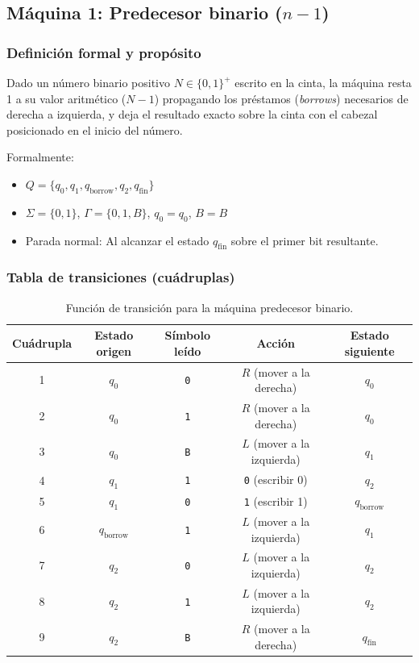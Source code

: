 \documentclass[11pt,letterpaper]{article}
\begin{document}
\subsection{Máquina 1: Predecesor binario ($n - 1$)}

\subsubsection{Definición formal y propósito}
Dado un número binario positivo $N \in \{0, 1\}^+$ escrito en la cinta, la máquina resta 1 a su valor aritmético ($N - 1$) propagando los préstamos (\textit{borrows}) necesarios de derecha a izquierda, y deja el resultado exacto sobre la cinta con el cabezal posicionado en el inicio del número.

Formalmente:
\begin{itemize}
    \item $Q = \{q_0, q_1, q_{\text{borrow}}, q_2, q_{\text{fin}}\}$
    \item $\Sigma = \{0, 1\}$, $\Gamma = \{0, 1, B\}$, $q_0 = q_0$, $B = B$
    \item Parada normal: Al alcanzar el estado $q_{\text{fin}}$ sobre el primer bit resultante.
\end{itemize}

\subsubsection{Tabla de transiciones (cuádruplas)}
\begin{table}[h!]
\centering
\small
\begin{tabular}{ccccc}
\toprule
\textbf{Cuádrupla} & \textbf{Estado origen} & \textbf{Símbolo leído} & \textbf{Acción} & \textbf{Estado siguiente} \\
\midrule
1 & $q_0$ & \texttt{0} & $R$ (mover a la derecha) & $q_0$ \\
2 & $q_0$ & \texttt{1} & $R$ (mover a la derecha) & $q_0$ \\
3 & $q_0$ & \texttt{B} & $L$ (mover a la izquierda) & $q_1$ \\
\midrule
4 & $q_1$ & \texttt{1} & \texttt{0} (escribir 0) & $q_2$ \\
5 & $q_1$ & \texttt{0} & \texttt{1} (escribir 1) & $q_{\text{borrow}}$ \\
6 & $q_{\text{borrow}}$ & \texttt{1} & $L$ (mover a la izquierda) & $q_1$ \\
\midrule
7 & $q_2$ & \texttt{0} & $L$ (mover a la izquierda) & $q_2$ \\
8 & $q_2$ & \texttt{1} & $L$ (mover a la izquierda) & $q_2$ \\
9 & $q_2$ & \texttt{B} & $R$ (mover a la derecha) & $q_{\text{fin}}$ \\
\bottomrule
\end{tabular}
\caption{Función de transición para la máquina predecesor binario.}
\end{table}
\end{document}
